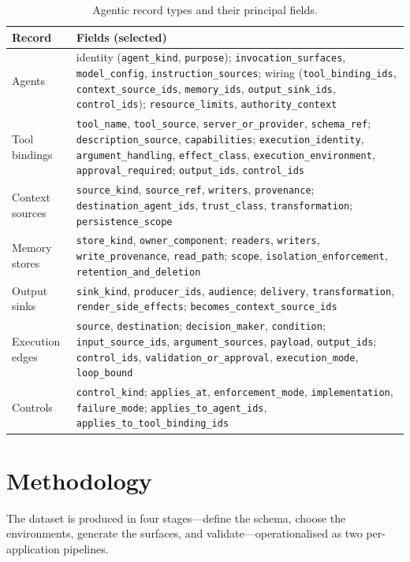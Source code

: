 \documentclass[11pt,a4paper]{article}
\newcommand{\cd}[1]{\lstinline[basicstyle=\ttfamily\small]|#1|}
\begin{document}
\begin{table}[ht]\centering\small
\caption{Agentic record types and their principal fields.}\label{tab:ag}
\begin{tabularx}{\textwidth}{@{}l>{\raggedright\arraybackslash}X@{}}
\toprule
\textbf{Record} & \textbf{Fields (selected)}\\
\midrule
Agents          & identity (\cd{agent_kind}, \cd{purpose}); \cd{invocation_surfaces}, \cd{model_config}, \cd{instruction_sources}; wiring (\cd{tool_binding_ids}, \cd{context_source_ids}, \cd{memory_ids}, \cd{output_sink_ids}, \cd{control_ids}); \cd{resource_limits}, \cd{authority_context}\\
Tool bindings   & \cd{tool_name}, \cd{tool_source}, \cd{server_or_provider}, \cd{schema_ref}; \cd{description_source}, \cd{capabilities}; \cd{execution_identity}, \cd{argument_handling}, \cd{effect_class}, \cd{execution_environment}, \cd{approval_required}; \cd{output_ids}, \cd{control_ids}\\
Context sources & \cd{source_kind}, \cd{source_ref}, \cd{writers}, \cd{provenance}; \cd{destination_agent_ids}, \cd{trust_class}, \cd{transformation}; \cd{persistence_scope}\\
Memory stores   & \cd{store_kind}, \cd{owner_component}; \cd{readers}, \cd{writers}, \cd{write_provenance}, \cd{read_path}; \cd{scope}, \cd{isolation_enforcement}, \cd{retention_and_deletion}\\
Output sinks    & \cd{sink_kind}, \cd{producer_ids}, \cd{audience}; \cd{delivery}, \cd{transformation}, \cd{render_side_effects}; \cd{becomes_context_source_ids}\\
Execution edges & \cd{source}, \cd{destination}; \cd{decision_maker}, \cd{condition}; \cd{input_source_ids}, \cd{argument_sources}, \cd{payload}, \cd{output_ids}; \cd{control_ids}, \cd{validation_or_approval}, \cd{execution_mode}, \cd{loop_bound}\\
Controls        & \cd{control_kind}; \cd{applies_at}, \cd{enforcement_mode}, \cd{implementation}, \cd{failure_mode}; \cd{applies_to_agent_ids}, \cd{applies_to_tool_binding_ids}\\
\bottomrule
\end{tabularx}
\end{table}

\section{Methodology}
The dataset is produced in four stages---define the schema, choose the environments,
generate the surfaces, and validate---operationalised as two per-application pipelines.
\end{document}
